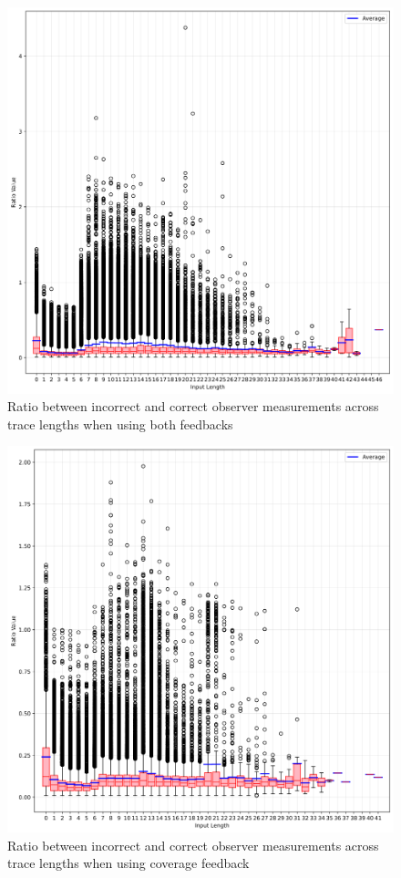 \documentclass[twocolumn]{article}
\begin{document}
\begin{figure}
  \includegraphics[width=\columnwidth]{assets/consistency/both-boxplot.png}
  \caption{Ratio between incorrect and correct observer measurements across trace lengths when using both feedbacks}
  \label{fig:both-inter-boxplot}
\end{figure}
\begin{figure}
  \includegraphics[width=\columnwidth]{assets/consistency/coverage-boxplot.png}
  \caption{Ratio between incorrect and correct observer measurements across trace lengths when using coverage feedback}
  \label{fig:cov-inter-boxplot}
\end{figure}
\end{document}
